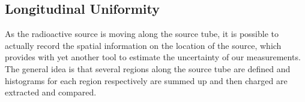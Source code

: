 

\subsection{Longitudinal Uniformity}
As the radioactive source is moving along the source tube, it is possible to actually record the spatial information on the location of the source, which provides with yet another tool to estimate the uncertainty of our measurements. The general idea is that several regions along the source tube are defined and histograms for each region respectively are summed up and then charged are extracted and compared.

